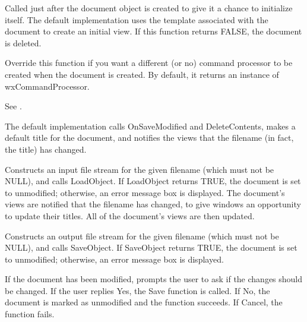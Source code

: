 
Called just after the document object is created to give it a chance
to initialize itself. The default implementation uses the
template associated with the document to create an initial view.
If this function returns FALSE, the document is deleted.



Override this function if you want a different (or no) command processor
to be created when the document is created. By default, it returns
an instance of wxCommandProcessor.

See .



The default implementation calls OnSaveModified and DeleteContents, makes a default title for the
document, and notifies the views that the filename (in fact, the title) has changed.



Constructs an input file stream for the given filename (which must not be NULL),
and calls LoadObject. If LoadObject returns TRUE, the document is set to
unmodified; otherwise, an error message box is displayed. The document's
views are notified that the filename has changed, to give windows an opportunity
to update their titles. All of the document's views are then updated.



Constructs an output file stream for the given filename (which must not be NULL),
and calls SaveObject. If SaveObject returns TRUE, the document is set to
unmodified; otherwise, an error message box is displayed.



If the document has been modified, prompts the user to ask if the changes should
be changed. If the user replies Yes, the Save function is called. If No, the
document is marked as unmodified and the function succeeds. If Cancel, the
function fails.

